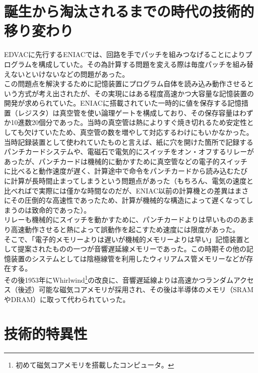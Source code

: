 \documentclass[a4paper,report]{jsbook}
\begin{document}
\section{誕生から淘汰されるまでの時代の技術的移り変わり}\label{ux8a95ux751fux304bux3089ux6dd8ux6c70ux3055ux308cux308bux307eux3067ux306eux6642ux4ee3ux306eux6280ux8853ux7684ux79fbux308aux5909ux308fux308a}

EDVACに先行するENIACでは、回路を手でパッチを組みつなげることによりプログラムを構成していた。その為計算する問題を変える際は毎度パッチを組み替えないといけないなどの問題があった。\\
この問題点を解決するために記憶装置にプログラム自体を読み込み動作させるという方式が考え出されたが、その実現にはある程度高速かつ大容量な記憶装置の開発が求められていた。ENIACに搭載されていた一時的に値を保存する記憶措置（レジスタ）は真空管を使い論理ゲートを構成しており、その保存容量はわずか10進数20個分であった。当時の真空管は熱によりすぐ焼き切れるため安定性としても欠けていたため、真空管の数を増やして対応するわけにもいかなかった。\\
当時記録装置として使われていたものと言えば、紙に穴を開けた箇所で記録するパンチカードシステムや、電磁石で電気的にスイッチをオン・オフするリレーがあったが、パンチカードは機械的に動かすために真空管などの電子的スイッチに比べると動作速度が遅く、計算途中で命令をパンチカードから読み込むたびに計算が長時間止まってしまうという問題点があった（もちろん、電気の速度と比べればで実際には僅かな時間なのだが、ENIAC以前の計算機との差異はまさにその圧倒的な高速性であったため、計算が機械的な構造によって遅くなってしまうのは致命的であった）。\\
リレーも機械的にスイッチを動かすために、パンチカードよりは早いもののあまり高速動作させると熱によって誤動作を起こすため速度には限度があった。\\
そこで、「電子的メモリーよりは遅いが機械的メモリーよりは早い」記憶装置として提案されたものの一つが音響遅延線メモリーであった。この時期その他の記憶装置のシステムとしては陰極線管を利用したウィリアムス管メモリーなどが存在する\autocite{invent_computer}。\\
その後1953年にWhirlwind\footnote{初めて磁気コアメモリを搭載したコンピュータ。}の改良に、音響遅延線よりは高速かつランダムアクセス（後述）可能な磁気コアメモリが採用され、その後は半導体のメモリ（SRAMやDRAM）に取って代わられていった。

\section{技術的特異性}\label{ux6280ux8853ux7684ux7279ux7570ux6027}
\end{document}
